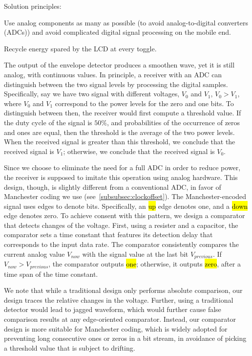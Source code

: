 Solution principles:
\begin{Itemize}
\item Use analog components as many as possible (to avoid analog-to-digital converters (ADCs)) and avoid complicated digital signal processing on the mobile end. 
\item Recycle energy spared by the LCD at every toggle.
\end{Itemize}

The output of the envelope detector produces a smoothen wave, yet it is still analog, with continuous values. In principle, a receiver with an ADC can distinguish between the two signal levels by processing the digital samples. Specifically, say we have two signal with different voltages, $V_0$ and $V_1$, $V_0 > V_1$, where $V_0$ and $V_1$ correspond to the power levels for the zero and one bits. To distinguish between then, the receiver would first compute a threshold value. If the duty cycle of the signal is $50\%$, and probabilities of the occurrence of zeros and ones are equal, then the threshold is the average of the two power levels. When the received signal is greater than this threshold, we conclude that the received signal is $V_1$; otherwise, we conclude that the received signal is $V_0$.

Since we choose to eliminate the need for a full ADC in order to reduce power, the receiver is supposed to imitate this operation using analog hardware. This design, though, is slightly different from a conventional ADC, in favor of Manchester coding we use (see~\ref{subsubsec:clockoffset}). The Manchester-encoded signal uses edges to denote bits. Specifically, an \hl{up} edge denotes one, and a \hl{down} edge denotes zero. To achieve consent with this pattern, we design a comparator that detects changes of the voltage. First, using a resister and a capacitor, the comparator sets a time constant that features its detection delay that corresponds to the input data rate. The comparator consistently compares the current analog value $V_{now}$ with the signal value at the last bit $V_{previous}$. If $V_{now} > V_{previous}$, the comparator outputs \hl{one}; otherwise, it outputs \hl{zero}, after a time span of the time constant. 

We note that while a traditional design only performs absolute comparison, our design traces the relative changes in the voltage. Further, using a traditional detector would lead to jagged waveform, which would further cause false comparison results at any edge-oriented comparator. Instead, our comparator design is more suitable for Manchester coding, which is widely adopted for preventing long consecutive ones or zeros in a bit stream, in avoidance of picking a threshold value that is subject to drifting. 






